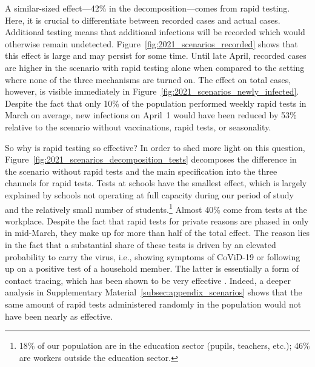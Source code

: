 A similar-sized effect---42\% in the decomposition---comes from rapid testing. Here, it
is crucial to differentiate between recorded cases and actual cases. Additional testing
means that additional infections will be recorded which would otherwise remain
undetected. Figure~\ref{fig:2021_scenarios_recorded} shows that this effect is large and
may persist for some time. Until late April, recorded cases are higher in the scenario
with rapid testing alone when compared to the setting where none of the three mechanisms
are turned on. The effect on total cases, however, is visible immediately in
Figure~\ref{fig:2021_scenarios_newly_infected}. Despite the fact that only 10\% of the
population performed weekly rapid tests in March on average, new infections on April~1
would have been reduced by 53\% relative to the scenario without vaccinations, rapid
tests, or seasonality. \label{r.1.b}

So why is rapid testing so effective? In order to shed more light on this question,
Figure~\ref{fig:2021_scenarios_decomposition_tests} decomposes the difference in the
scenario without rapid tests and the main specification into the three channels for
rapid tests. Tests at schools have the smallest effect, which is largely explained by
schools not operating at full capacity during our period of study and the relatively
small number of students.\footnote{18\% of our population are in the education sector
    (pupils, teachers, etc.); 46\% are workers outside the education sector.} Almost 40\%
come from tests at the workplace. Despite the fact that rapid tests for private reasons
are phased in only in mid-March, they make up for more than half of the total effect.
The reason lies in the fact that a substantial share of these tests is driven by an
elevated probability to carry the virus, i.e., showing symptoms of CoViD-19 or following
up on a positive test of a household member. The latter is essentially a form of contact
tracing, which has been shown to be very effective \citep{Contreras2021,
    Fetzer2021,Kretzschmar2020}. Indeed, a deeper analysis in Supplementary
Material~\ref{subsec:appendix_scenarios} shows that the same amount of rapid tests
administered randomly in the population would not have been nearly as effective.


